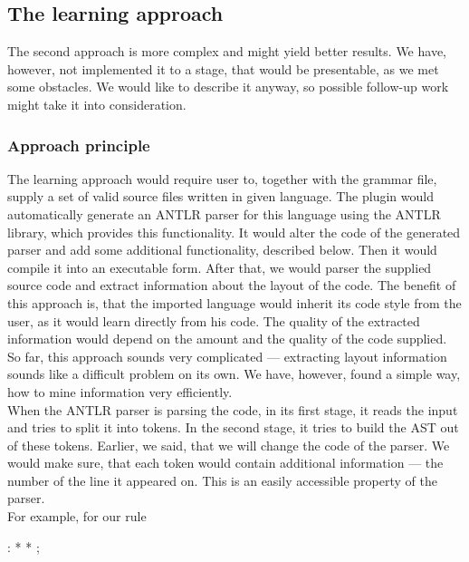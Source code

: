 \subsection{The learning approach}
\label{chap:learning_approach}

The second approach is more complex and might yield better results.
We have, however, not implemented it to a stage, that would be presentable, as we met some obstacles.
We would like to describe it anyway, so possible follow-up work might take it into consideration.
\\

\subsubsection{Approach principle}

The learning approach would require user to, together with the grammar file, supply a set of valid source files written in given language.
The plugin would automatically generate an ANTLR parser for this language using the ANTLR library, which provides this functionality.
It would alter the code of the generated parser and add some additional functionality, described below.
Then it would compile it into an executable form.
After that, we would parser the supplied source code and extract information about the layout of the code.
The benefit of this approach is, that the imported language would inherit its code style from the user, as it would learn directly from his code.
The quality of the extracted information would depend on the amount and the quality of the code supplied.
So far, this approach sounds very complicated --- extracting layout information sounds like a difficult problem on its own.
We have, however, found a simple way, how to mine information very efficiently.
\\

When the ANTLR parser is parsing the code, in its first stage, it reads the input and tries to split it into tokens.
In the second stage, it tries to build the AST out of these tokens.
Earlier, we said, that we will change the code of the parser.
We would make sure, that each token would contain additional information --- the number of the line it appeared on.
This is an easily accessible property of the parser.
\\

\noindent
For example, for our  rule

\begin{antlr}
	  :   \literal{<}  * \literal{>} * \literal{</}  \literal{>} ;
\end{antlr}


